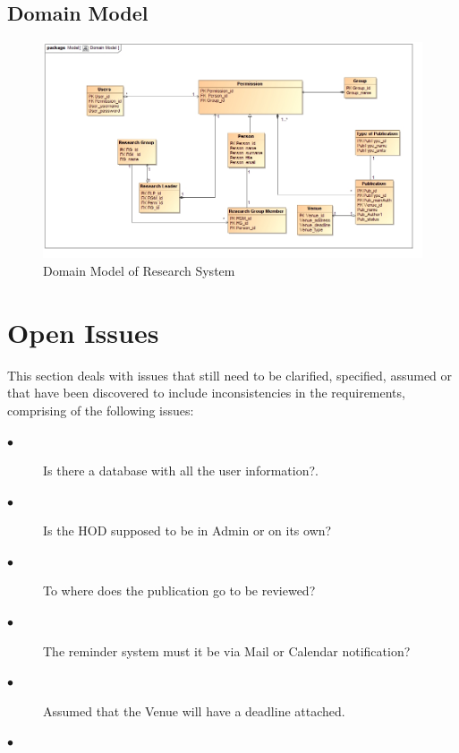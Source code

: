 \documentclass[a4paper]{article}
\begin{document}
	\subsection{Domain Model}
	\begin{figure}[H]
		\includegraphics[width=\textwidth]{DomainModel.jpg}
		\caption{Domain Model of Research System \label{overflow}}
	\end{figure}
	\section{Open Issues}
	This section deals with issues that still need to be clarified, specified, assumed or that have been discovered to include inconsistencies in the requirements, comprising of the following issues:
	\begin{description}
		\item[$\bullet$] Is there a database with all the user information?.
	\end{description}
	\begin{description}
		\item[$\bullet$] Is the HOD supposed to be in Admin or on its own?
	\end{description}
	\begin{description}
	\item[$\bullet$] To where does the publication go to be reviewed?
	\end{description}
	\begin{description}
	\item[$\bullet$] The reminder system must it be via Mail or Calendar notification?
	\end{description}
	\begin{description}
	\item[$\bullet$] Assumed that the Venue will have a deadline attached.
	\end{description}
	\begin{description}
	\item[$\bullet$] 
	\end{description}	
\end{document}
